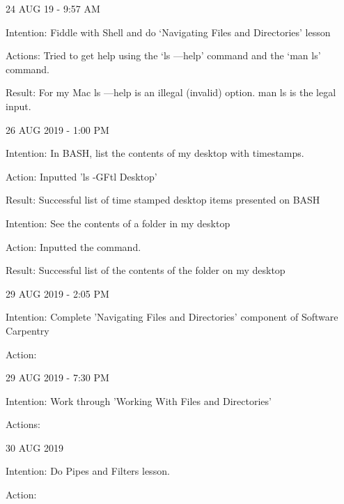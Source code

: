 24 AUG 19 - 9:57 AM

Intention: Fiddle with Shell and do ‘Navigating Files and Directories’ lesson

Actions: Tried to get help using the ‘ls —help’ command and the ‘man ls’ command.

Result: For my Mac ls —help is an illegal (invalid) option. man ls is the legal input.


26 AUG 2019 - 1:00 PM

Intention: In BASH, list the contents of my desktop with timestamps.

Action: Inputted 'ls -GFtl Desktop'

Result: Successful list of time stamped desktop items presented on BASH

Intention: See the contents of a folder in my desktop

Action: Inputted the command.

Result: Successful list of the contents of the folder on my desktop

29 AUG 2019 - 2:05 PM

Intention: Complete 'Navigating Files and Directories' component of Software Carpentry

Action: 


29 AUG 2019 - 7:30 PM

Intention: Work through 'Working With Files and Directories'

Actions: 

30 AUG 2019

Intention: Do Pipes and Filters lesson.

Action: 
